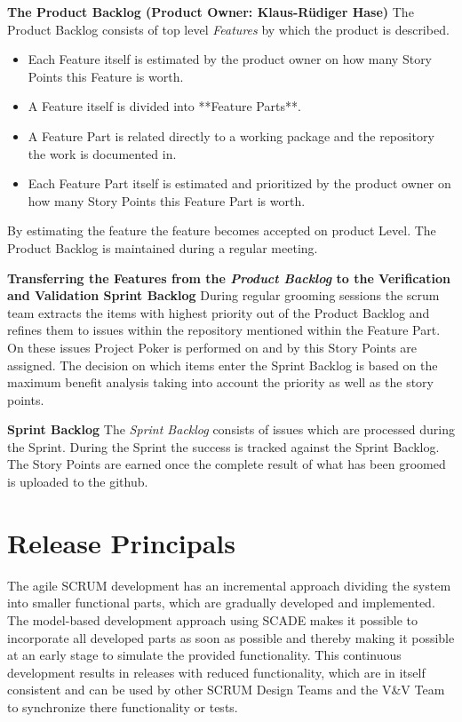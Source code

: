 \textbf{The Product Backlog (Product Owner: Klaus-Rüdiger Hase)}
The Product Backlog consists of top level \textit{Features} by which the product is described.
\begin{itemize}
\item  Each Feature itself is estimated by the product owner on how many Story Points this Feature is worth.
\item  A Feature itself is divided into **Feature Parts**.
\item  A Feature Part is related directly to a working package and the repository the work is documented in.
\item  Each Feature Part itself is estimated and prioritized by the product owner on how many Story Points this Feature Part is worth.
\end{itemize}


By estimating the feature the feature becomes accepted on product Level.
The Product Backlog is maintained during a regular meeting.

\textbf{Transferring the Features from the \textit{Product Backlog} to the Verification and Validation Sprint Backlog}
During regular grooming sessions the scrum team extracts the items with highest priority out of the Product Backlog and refines them to issues within the repository mentioned within the Feature Part.
On these issues Project Poker is performed on and by this Story Points are assigned. The decision on which items enter the Sprint Backlog is based on the maximum benefit analysis taking into account the priority as well as the story points.

\textbf{Sprint Backlog}
The \textit{Sprint Backlog} consists of issues which are processed during the Sprint.
During the Sprint the success is tracked against the Sprint Backlog.
The Story Points are earned once the complete result of what has been groomed is uploaded to the github.

\chapter{Release Principals}
\label{sec:Releases}

The agile SCRUM development has an incremental approach dividing the system into smaller functional parts, which are gradually developed and implemented. The model-based development approach using SCADE makes it possible to incorporate all developed parts as soon as possible and thereby making it possible at an early stage to simulate the provided functionality. This continuous development results in releases with reduced functionality, which are in itself consistent and can be used by other SCRUM Design Teams and the V\&V Team to synchronize there functionality or tests.


